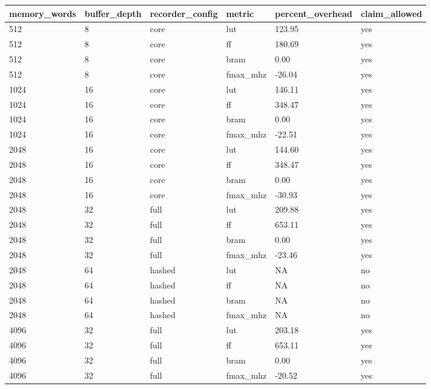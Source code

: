 \begin{tabular}{llllll}
 \hline
memory\_words & buffer\_depth & recorder\_config & metric & percent\_overhead & claim\_allowed \\
 \hline
512 & 8 & core & lut & 123.95 & yes \\
512 & 8 & core & ff & 180.69 & yes \\
512 & 8 & core & bram & 0.00 & yes \\
512 & 8 & core & fmax\_mhz & -26.04 & yes \\
1024 & 16 & core & lut & 146.11 & yes \\
1024 & 16 & core & ff & 348.47 & yes \\
1024 & 16 & core & bram & 0.00 & yes \\
1024 & 16 & core & fmax\_mhz & -22.51 & yes \\
2048 & 16 & core & lut & 144.60 & yes \\
2048 & 16 & core & ff & 348.47 & yes \\
2048 & 16 & core & bram & 0.00 & yes \\
2048 & 16 & core & fmax\_mhz & -30.93 & yes \\
2048 & 32 & full & lut & 209.88 & yes \\
2048 & 32 & full & ff & 653.11 & yes \\
2048 & 32 & full & bram & 0.00 & yes \\
2048 & 32 & full & fmax\_mhz & -23.46 & yes \\
2048 & 64 & hashed & lut & NA & no \\
2048 & 64 & hashed & ff & NA & no \\
2048 & 64 & hashed & bram & NA & no \\
2048 & 64 & hashed & fmax\_mhz & NA & no \\
4096 & 32 & full & lut & 203.18 & yes \\
4096 & 32 & full & ff & 653.11 & yes \\
4096 & 32 & full & bram & 0.00 & yes \\
4096 & 32 & full & fmax\_mhz & -20.52 & yes \\
 \hline
\end{tabular}
